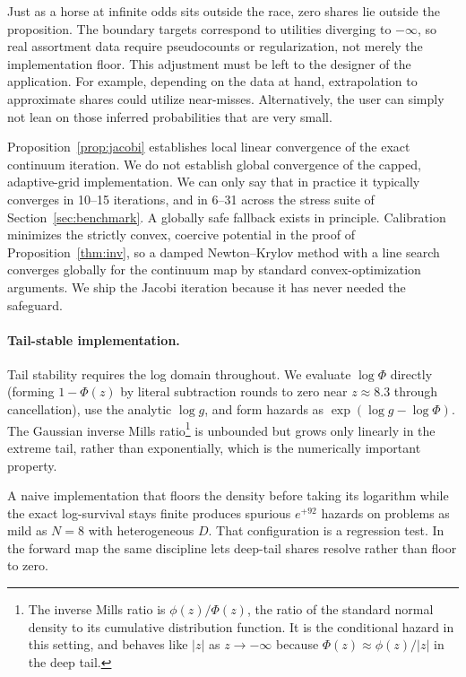 \documentclass[12pt]{article}
\theoremstyle{remark}
\begin{document}
Just as a horse at infinite odds sits outside the race, zero shares lie outside the proposition. The boundary targets
correspond to utilities diverging to $-\infty$, so real assortment data
require pseudocounts or regularization, not merely the implementation
floor. This adjustment must be left to the designer of the application. For example, depending
on the data at hand, extrapolation to approximate shares could utilize near-misses. Alternatively, the user can
simply not lean on those inferred probabilities that are very small. 

Proposition~\ref{prop:jacobi} establishes local linear convergence of
the exact continuum iteration. We do not establish global convergence
of the capped, adaptive-grid implementation. We can only
say that in practice it typically converges in 10--15 iterations, and in 6--31 across the stress suite of
Section~\ref{sec:benchmark}. A globally safe fallback exists in
principle. Calibration minimizes the strictly convex, coercive
potential in the proof of Proposition~\ref{thm:inv}, so a damped
Newton--Krylov method with a line search converges globally for the
continuum map by standard convex-optimization arguments. We ship the
Jacobi iteration because it has never needed the safeguard.

\paragraph{Tail-stable implementation.} Tail stability requires the log
domain throughout. We evaluate $\log \Phi$ directly (forming $1 - \Phi(z)$
by literal subtraction rounds to zero near $z \approx 8.3$ through
cancellation), use the analytic $\log g$, and form hazards as
$\exp(\log g - \log \Phi)$. The Gaussian inverse Mills ratio\footnote{The
inverse Mills ratio is $\phi(z)/\Phi(z)$, the ratio of the standard
normal density to its cumulative distribution function. It is the
conditional hazard in this setting, and behaves like $|z|$ as $z \to
-\infty$ because $\Phi(z) \approx \phi(z)/|z|$ in the deep tail.} is
unbounded but grows only linearly in the extreme tail, rather than
exponentially, which is the numerically important property.

A naive implementation that floors the density before taking its
logarithm while the exact log-survival stays finite produces spurious $e^{+92}$ hazards on problems as
mild as $N = 8$ with heterogeneous $D$.  That configuration is a regression
test. In the forward map the same discipline lets deep-tail shares resolve
rather than floor to zero. 
\end{document}
